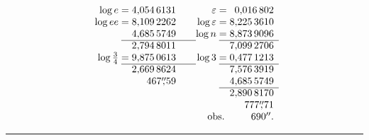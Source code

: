 \[
\begin{array}{r@{\;}c@{\;}r@{\qquad}r@{\;}c@{\;}r}
 \log e&=&4{,}054\,6131 &\varepsilon&=&0{,}016\,802\\
 \log ee&=&8{,}109\,2262 &\log\varepsilon&=&8{,}225\,3610\\
 &&4{,}685\,5749 &\log n&=&8{,}873\,9096\\ \cline{2-3}\cline{5-6}
 &&2{,}794\,8011 &&&7{,}099\,2706\\
 \log\tfrac34&=&9{,}875\,0613 &\log3&=&0{,}477\,1213\\ \cline{2-3}\cline{5-6}
 &&2{,}669\,8624 &&&7{,}576\,3919\\
 &&467\overset{\prime\prime}{,}59 &&&4{,}685\,5749\\ \cline{5-6}
 &&&&&2{,}890\,8170\\
 &&&&&777\overset{\prime\prime}{,}71\\
 &&&\multicolumn{2}{r}{\text{obs.}}&690^{\prime\prime}.
\end{array}
\]
\par\begin{center}\rule{.18\linewidth}{.4pt}\end{center}
\clearpage
\endgroup
